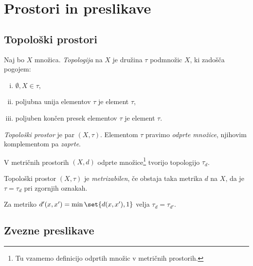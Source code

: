 \section{Prostori in preslikave}

\subsection{Topološki prostori}


\begin{okvir}
\begin{definicija}
Naj bo $X$ množica. \emph{Topologija} na $X$ je
družina $\tau$ podmnožic $X$, ki zadošča pogojem:

\begin{enumerate}[i)]
\item $\emptyset, X \in \tau$,
\item poljubna unija elementov $\tau$ je element
$\tau$,
\item poljuben končen presek elementov $\tau$ je element
$\tau$.
\end{enumerate}

\emph{Topološki prostor} je par
$(X,\tau)$. Elementom $\tau$ pravimo
\emph{odprte množice},
njihovim komplementom pa \emph{zaprte}.
\end{definicija}
\end{okvir}

\begin{opomba}
V metričnih prostorih $(X,d)$ odprte množice\footnote{Tu vzamemo
definicijo odprtih množic v metričnih prostorih.} tvorijo
topologijo $\tau_d$.
\end{opomba}

\begin{definicija}
Topološki prostor $(X,\tau)$ je
\emph{metrizabilen}, če
obstaja taka metrika $d$ na $X$, da je
$\tau = \tau_d$ pri zgornjih oznakah.
\end{definicija}

\begin{opomba}
Za metriko $d'(x,x') = \min \set{d(x,x'),1}$ velja
$\tau_d = \tau_{d'}$.
\end{opomba}

\newpage

\subsection{Zvezne preslikave}

